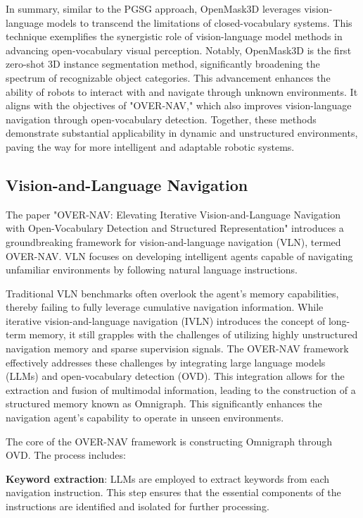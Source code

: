In summary, similar to the PGSG approach, OpenMask3D leverages vision-language models to transcend the limitations of closed-vocabulary systems. This technique exemplifies the synergistic role of vision-language model methods in advancing open-vocabulary visual perception. Notably, OpenMask3D is the first zero-shot 3D instance segmentation method, significantly broadening the spectrum of recognizable object categories. This advancement enhances the ability of robots to interact with and navigate through unknown environments. It aligns with the objectives of "OVER-NAV," which also improves vision-language navigation through open-vocabulary detection. Together, these methods demonstrate substantial applicability in dynamic and unstructured environments, paving the way for more intelligent and adaptable robotic systems.


\subsection{Vision-and-Language Navigation}

The paper "OVER-NAV: Elevating Iterative Vision-and-Language Navigation with Open-Vocabulary Detection and Structured Representation" introduces a groundbreaking framework for vision-and-language navigation (VLN), termed OVER-NAV. VLN focuses on developing intelligent agents capable of navigating unfamiliar environments by following natural language instructions.

Traditional VLN benchmarks often overlook the agent's memory capabilities, thereby failing to fully leverage cumulative navigation information. While iterative vision-and-language navigation (IVLN) introduces the concept of long-term memory, it still grapples with the challenges of utilizing highly unstructured navigation memory and sparse supervision signals. The OVER-NAV framework effectively addresses these challenges by integrating large language models (LLMs) and open-vocabulary detection (OVD). This integration allows for the extraction and fusion of multimodal information, leading to the construction of a structured memory known as Omnigraph. This significantly enhances the navigation agent’s capability to operate in unseen environments.





The core of the OVER-NAV framework is constructing Omnigraph through OVD. The process includes:

\textbf{Keyword extraction}: LLMs are employed to extract keywords from each navigation instruction. This step ensures that the essential components of the instructions are identified and isolated for further processing.


